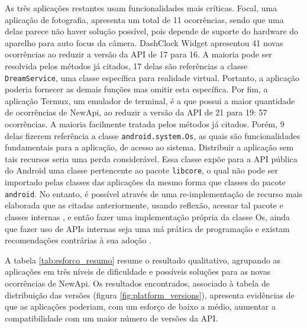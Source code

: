 As três aplicações restantes usam funcionalidades mais críticas. Focal, uma
aplicação de fotografia, apresenta um total de 11 ocorrências, sendo que uma
delas parece não haver solução possível, pois depende de suporte do hardware
do aparelho para auto focus da câmera. DashClock Widget apresentou 41 novas
ocorrências ao reduzir a versão da API de 17 para 16. A maioria pode ser
resolvida pelos métodos já citados, 17 delas são referências a classe
\texttt{DreamService}, uma classe específica para realidade virtual.
Portanto, a aplicação poderia fornecer as demais funções mas omitir esta
específica. Por fim, a aplicação Termux, um emulador de terminal, é a que
possui a maior quantidade de ocorrências de NewApi, ao reduzir a versão da
API de 21 para 19: 57 ocorrências. A maioria facilmente tratada pelos métodos
já citados. Porém, 9 delas fizerem referência a classe \texttt{android.system.Os},
as quais são funcionalidades fundamentais para a aplicação, de acesso ao sistema.
Distribuir a aplicação sem tais recursos seria uma perda considerável. Essa classe
expõe para a API pública do Android uma classe pertencente ao pacote \texttt{libcore},
o qual não pode ser importado pelas classes das aplicações da mesmo forma que classes
do pacote \texttt{android}. No entanto, é possível através de uma re-implementação de
recurso mais elaborada que as citadas anteriormente, usando reflexão, acessar tal pacote
e classes internas \cite{Libcore}, e então fazer uma implementação própria da classe Os,
ainda que fazer uso de APIs internas seja uma má prática de programação e existam
recomendações contrárias à sua adoção \cite{Businge2015} \cite{Mastrangelo2015}.

A tabela \ref{tab:esforco_resumo} resume o resultado qualitativo, agrupando as aplicações
em três níveis de dificuldade e possíveis soluções para as novas ocorrências de NewApi.
Os resultados encontrados, associado à tabela de distribuição das versões (figura 
\ref{fig:platform_versions}), apresenta evidências de que as aplicações poderiam,
com um esforço de baixo a médio, aumentar a compatibilidade com um maior número de
versões da API.  

